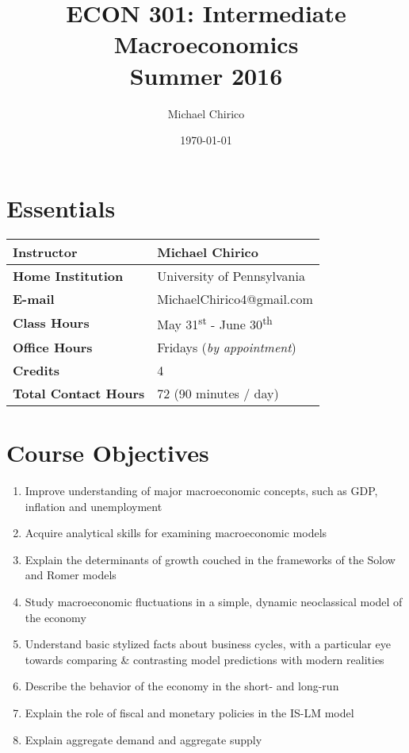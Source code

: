 \documentclass{article}
\begin{document}
\title{ECON 301: Intermediate Macroeconomics \\ Summer 2016}

\author{Michael Chirico}

\date{\today}

\maketitle

\section*{Essentials}

\begin{table}[h]
\centering
\begin{tabular}{|l|l|}
\hline
\textbf{Instructor} & Michael Chirico \\
\hline
\textbf{Home Institution} & University of Pennsylvania \\
\hline
\textbf{E-mail} & MichaelChirico4@gmail.com \\
\hline
\textbf{Class Hours} & May 31\textsuperscript{st} - June 30\textsuperscript{th} \\
\hline
\textbf{Office Hours} & Fridays (\textit{by appointment}) \\
\hline
\textbf{Credits} & 4 \\
\hline
\textbf{Total Contact Hours} & 72 (90 minutes / day) \\
\hline
\end{tabular}
\end{table}

\section*{Course Objectives}

\begin{enumerate}
\item Improve understanding of major macroeconomic concepts, such as GDP, inflation and unemployment
\item Acquire analytical skills for examining macroeconomic models
\item Explain the determinants of growth couched in the frameworks of the Solow and Romer models
\item Study macroeconomic fluctuations in a simple, dynamic neoclassical model of the economy
\item Understand basic stylized facts about business cycles, with a particular eye towards comparing \& contrasting model predictions with modern realities
\item Describe the behavior of the economy in the short- and long-run
\item Explain the role of fiscal and monetary policies in the IS-LM model
\item Explain aggregate demand and aggregate supply
\end{enumerate}
\end{document}
